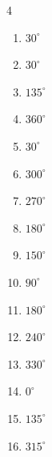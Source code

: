 \begin{multicols}{4}
\begin{enumerate}
  \item $\displaystyle 30^{\circ}$

  \item $\displaystyle 30^{\circ}$

\columnbreak %

\resetques

  \item $\displaystyle 135^{\circ}$

  \item $\displaystyle 360^{\circ}$
        \phantom{$\displaystyle =2\pi$}

  \item $\displaystyle 30^{\circ}$

  \item $\displaystyle 300^{\circ}$

  \item $\displaystyle 270^{\circ}$

  \item $\displaystyle 180^{\circ}$
        \phantom{$\displaystyle =\pi$}

  \item $\displaystyle 150^{\circ}$

  \item $\displaystyle 90^{\circ}$

  \item $\displaystyle 180^{\circ}$
        \phantom{$\displaystyle =\pi$}

  \item $\displaystyle 240^{\circ}$

  \item $\displaystyle 330^{\circ}$

  \item $\displaystyle 0^{\circ}$
        \phantom{$\displaystyle =0$}

  \item $\displaystyle 135^{\circ}$

  \item $\displaystyle 315^{\circ}$


\end{enumerate}
\end{multicols}
